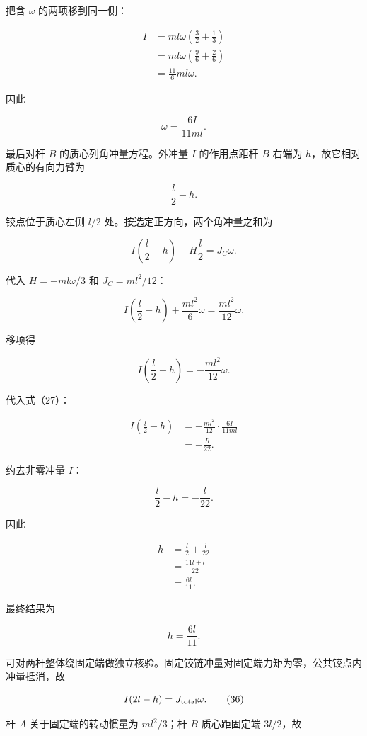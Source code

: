 \documentclass[12pt,a4paper,UTF8]{ctexart}
\begin{document}
把含 \(\omega\) 的两项移到同一侧：

\[
\begin{aligned}
I
&=ml\omega\left(\frac32+\frac13\right)\\
&=ml\omega\left(\frac96+\frac26\right)\\
&=\frac{11}{6}ml\omega.
\end{aligned} \tag{26}
\]

因此

\[
\omega=\frac{6I}{11ml}. \tag{27}
\]

最后对杆 \(B\) 的质心列角冲量方程。外冲量 \(I\) 的作用点距杆 \(B\)
右端为 \(h\)，故它相对质心的有向力臂为

\[
\frac l2-h. \tag{28}
\]

铰点位于质心左侧 \(l/2\) 处。按选定正方向，两个角冲量之和为

\[
I\left(\frac l2-h\right)
-H\frac l2
=J_C\omega. \tag{29}
\]

代入 \(H=-ml\omega/3\) 和 \(J_C=ml^2/12\)：

\[
I\left(\frac l2-h\right)
+\frac{ml^2}{6}\omega
=\frac{ml^2}{12}\omega. \tag{30}
\]

移项得

\[
I\left(\frac l2-h\right)
=-\frac{ml^2}{12}\omega. \tag{31}
\]

代入式（27）：

\[
\begin{aligned}
I\left(\frac l2-h\right)
&=-\frac{ml^2}{12}\cdot\frac{6I}{11ml}\\
&=-\frac{Il}{22}.
\end{aligned} \tag{32}
\]

约去非零冲量 \(I\)：

\[
\frac l2-h=-\frac l{22}. \tag{33}
\]

因此

\[
\begin{aligned}
h
&=\frac l2+\frac l{22}\\
&=\frac{11l+l}{22}\\
&=\frac{6l}{11}.
\end{aligned} \tag{34}
\]

最终结果为

\[
\boxed{h=\frac{6l}{11}}. \tag{35}
\]

可对两杆整体绕固定端做独立核验。固定铰链冲量对固定端力矩为零，公共铰点内冲量抵消，故

\[
I(2l-h)=J_{\rm total}\omega. \tag{36}
\]

杆 \(A\) 关于固定端的转动惯量为 \(ml^2/3\)；杆 \(B\) 质心距固定端
\(3l/2\)，故
\end{document}
